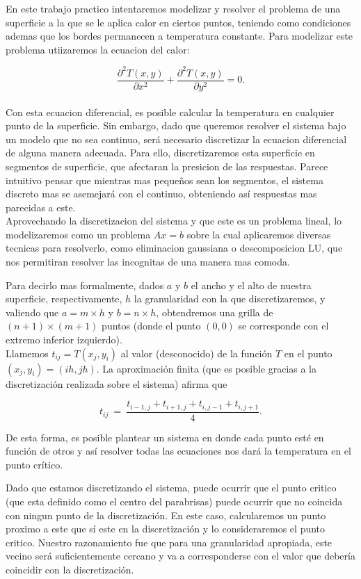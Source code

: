 En este trabajo practico intentaremos modelizar y resolver el problema de una superficie a la que se le aplica calor en ciertos puntos, teniendo como condiciones ademas que los bordes permanecen a temperatura constante. Para modelizar este problema utiizaremos la ecuacion del calor:

\begin{equation}
\frac{\partial^2T(x,y)}{\partial x^{2}}+\frac{\partial^2 T(x,y)}{\partial y^{2}} = 0.
\end{equation}\\

Con esta ecuacion diferencial, es posible calcular la temperatura en cualquier punto de la superficie. Sin embargo, dado que queremos resolver el sistema bajo un modelo que no sea continuo, ser\'a necesario discretizar la ecuacion diferencial de alguna manera adecuada. Para ello, discretizaremos esta superficie en segmentos de superficie, que afectaran la presicion de las respuestas. Parece intuitivo pensar que mientras mas pequeños sean los segmentos, el sistema discreto mas se asemejar\'a con el continuo, obteniendo as\'i respuestas mas parecidas a este.\\

Aprovechando la discretizacion del sistema y que este es un problema lineal, lo modelizaremos como un problema $Ax=b$ sobre la cual aplicaremos diversas tecnicas para resolverlo, como eliminacion gaussiana o descomposicion LU, que nos permitiran resolver las incognitas de una manera mas comoda.

Para decirlo mas formalmente, dados $a$ y $b$ el ancho y el alto de nuestra superficie, respectivamente, $h$ la granularidad con la que discretizaremos, y valiendo que  $a = m\times h$ y $b = n \times h$, obtendremos una grilla de $(n+1)\times(m+1)$ puntos (donde el punto $(0,0)$ se corresponde con el extremo inferior izquierdo).\\

Llamemos $t_{ij} = T(x_j,y_i)$ al valor (desconocido) de la funci\'on $T$ en el punto $(x_j, y_i) = (ih, jh)$. La aproximaci\'on finita (que es posible gracias a la discretizaci\'on realizada sobre el sistema) afirma que

\begin{equation}
t_{ij} \ =\ \frac{ t_{i-1,j} + t_{i+1,j} + t_{i,j-1} + t_{i,j+1}}{4}.
\end{equation}

De esta forma, es posible plantear un sistema en donde cada punto est\'e en funci\'on de otros y as\'i resolver todas las ecuaciones nos dar\'a la temperatura en el punto cr\'itico.

Dado que estamos discretizando el sistema, puede ocurrir que el punto critico (que esta definido como el centro del parabrisas) puede ocurrir que no coincida con ningun punto de la discretización. En este caso, calcularemos un punto proximo a este que sí este en la discretización y lo consideraremos el punto critico. Nuestro razonamiento fue que para una granularidad apropiada, este vecino será suficientemente cercano y va a corresponderse con el valor que debería coincidir con la discretización.